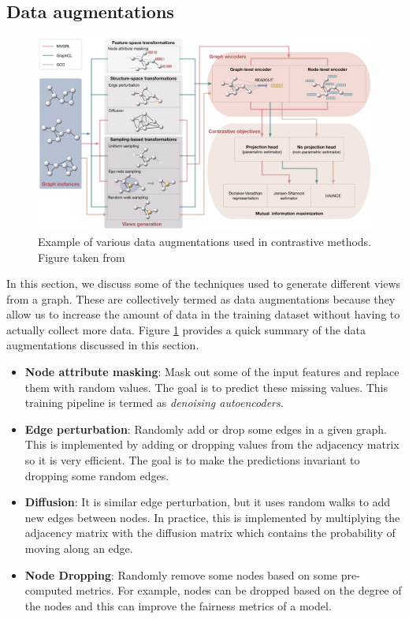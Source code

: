 \documentclass{article}
\begin{document}
\subsection{Data augmentations}

\begin{figure}
	\centering
	\includegraphics[scale=0.05]{figure2.jpg}
	\caption{Example of various data augmentations used in contrastive methods. Figure taken from \citep{cite1}}
	\label{fig:fig2}
\end{figure}

In this section, we discuss some of the techniques used to generate different views from a graph. These are collectively termed as data augmentations because they allow us to increase the amount of data in the training dataset without having to actually collect more data. Figure \ref{fig:fig2} provides a quick summary of the data augmentations discussed in this section.

\begin{itemize}
    \item \textbf{Node attribute masking}: Mask out some of the input features and replace them with random values. The goal is to predict these missing values. This training pipeline is termed as \textit{denoising autoencoders}.
    \item \textbf{Edge perturbation}: Randomly add or drop some edges in a given graph. This is implemented by adding or dropping values from the adjacency matrix so it is very efficient. The goal is to make the predictions invariant to dropping some random edges.
    \item \textbf{Diffusion}: It is similar edge perturbation, but it uses random walks to add new edges between nodes. In practice, this is implemented by multiplying the adjacency matrix with the diffusion matrix which contains the probability of moving along an edge.
    \item \textbf{Node Dropping}: Randomly remove some nodes based on some pre-computed metrics. For example, nodes can be dropped based on the degree of the nodes and this can improve the fairness metrics of a model.
\end{itemize}
\end{document}
